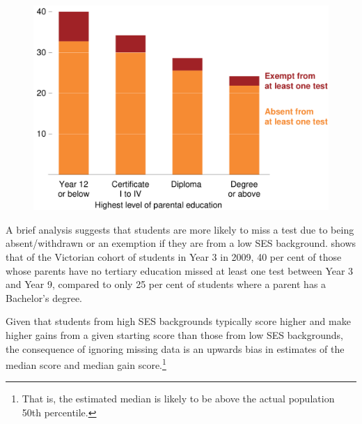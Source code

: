 \begin{figure}[t]
 \includegraphics[width=\columnwidth]{atlas/Missing_SES.pdf}\label{fig:missing}

\end{figure}

A brief analysis suggests that students are more likely to miss a test due to being absent/withdrawn or an exemption if they are from a low SES background.  shows that of the Victorian cohort of students in Year 3 in 2009, 40 per cent of those whose parents have no tertiary education missed at least one test between Year 3 and Year 9, compared to only 25 per cent of students where a parent has a Bachelor's degree.

Given that students from high SES backgrounds typically score higher and make higher gains from a given starting score than those from low SES backgrounds, the consequence of ignoring missing data is an upwards bias in estimates of the median score and median gain score.\footnote{That is, the estimated median is likely to be above the actual population 50th percentile.}

